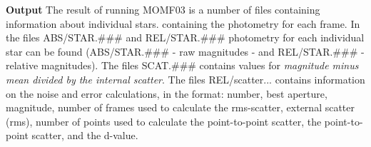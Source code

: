 \documentclass[]{article}
\begin{document}
\vspace{2mm}
{\bf Output}
\vspace{4mm}
\newline The result of running MOMF03 is a number of files containing
information about individual stars.
containing the photometry for each frame. In the files ABS/STAR.\#\#\#
and REL/STAR.\#\#\#
photometry for each individual star can be found (ABS/STAR.\#\#\# -
raw magnitudes - and REL/STAR.\#\#\# - relative magnitudes). The files
SCAT.\#\#\# contains values for {\em magnitude minus mean divided by the
internal scatter}. The files REL/scatter... contains information on the
noise and error calculations, in the format: number, best aperture,
magnitude, number of frames used to calculate the rms-scatter, external
scatter (rms), number of points used to calculate the point-to-point
scatter, the point-to-point scatter, and the d-value.
\newpage
\end{document}
